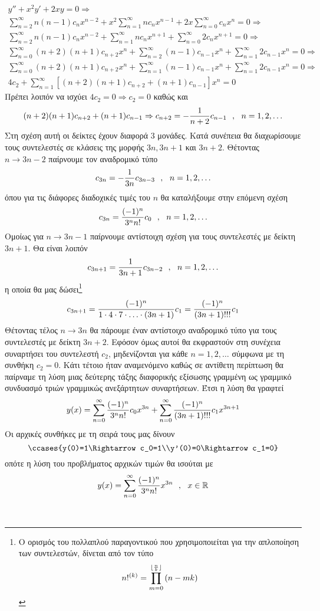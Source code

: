 \documentclass[a4paper,twoside,11pt]{book}
\DeclareRobustCommand{\frac}[3][0pt]{%
{\begingroup\hspace{#1}#2\hspace{#1}\endgroup\over\hspace{#1}#3\hspace{#1}}}
\begin{document}
\begin{rlist}
\begin{gather*}
y''+x^2y'+2xy=0\Rightarrow\\
\sum_{n=2}^{\infty}{n(n-1)c_nx^{n-2}}+x^2\sum_{n=1}^{\infty}{nc_nx^{n-1}}+2x\sum_{n=0}^{\infty}{c_nx^n}=0\Rightarrow\\
\sum_{n=2}^{\infty}{n(n-1)c_nx^{n-2}}+\sum_{n=1}^{\infty}{nc_nx^{n+1}}+\sum_{n=0}^{\infty}{2c_nx^{n+1}}=0\Rightarrow\\
\sum_{n=0}^{\infty}{(n+2)(n+1)c_{n+2}x^{n}}+\sum_{n=2}^{\infty}{(n-1)c_{n-1}x^{n}}+\sum_{n=1}^{\infty}{2c_{n-1}x^{n}}=0\Rightarrow\\
\sum_{n=0}^{\infty}{(n+2)(n+1)c_{n+2}x^{n}}+\sum_{n=1}^{\infty}{(n-1)c_{n-1}x^{n}}+\sum_{n=1}^{\infty}{2c_{n-1}x^{n}}=0\Rightarrow\\
4c_2+\sum_{n=1}^{\infty}{\left[(n+2)(n+1)c_{n+2}+(n+1)c_{n-1}\right]x^n}=0
\end{gather*}
Πρέπει λοιπόν να ισχύει $ 4c_2=0\Rightarrow c_2=0 $ καθώς και 
\[ (n+2)(n+1)c_{n+2}+(n+1)c_{n-1}\Rightarrow c_{n+2}=-\frac{1}{n+2}c_{n-1}\ \ ,\ \ n=1,2,\ldots \]
Στη σχέση αυτή οι δείκτες έχουν διαφορά $ 3 $ μονάδες. Κατά συνέπεια θα διαχωρίσουμε τους συντελεστές σε κλάσεις της μορφής $ 3n,3n+1 $ και $ 3n+2 $. Θέτοντας $ n\to 3n-2 $ παίρνουμε τον αναδρομικό τύπο
\[ c_{3n}=-\frac{1}{3n}c_{3n-3}\ \ ,\ \ n=1,2,\ldots \]
όπου για τις διάφορες διαδοχικές τιμές του $ n $ θα καταλήξουμε στην επόμενη σχέση
\[ c_{3n}=\frac{(-1)^n}{3^nn!}c_0\ \ ,\ \ n=1,2,\ldots \]
Ομοίως για $ n\to 3n-1 $ παίρνουμε αντίστοιχη σχέση για τους συντελεστές με δείκτη $ 3n+1 $. Θα είναι λοιπόν
\[ c_{3n+1}=\frac{1}{3n+1}c_{3n-2}\ \ ,\ \ n=1,2,\ldots \]
η οποία θα μας δώσει\footnote{Ο ορισμός του πολλαπλού παραγοντικού που χρησιμοποιείται για την απλοποίηση των συντελεστών, δίνεται από τον τύπο
\[ n!^{(k)}=\prod_{m=0}^{\lfloor\frac{n}{k} \rfloor}{(n-mk)} \]}
\[ c_{3n+1}=\frac{(-1)^n}{1\cdot4\cdot7\cdot\ldots\cdot(3n+1)}c_1=\frac{(-1)^n}{(3n+1)!!!}c_1 \]
Θέτοντας τέλος $ n\to 3n $ θα πάρουμε έναν αντίστοιχο αναδρομικό τύπο για τους συντελεστές με δείκτη $ 3n+2 $. Εφόσον όμως αυτοί θα εκφραστούν στη συνέχεια συναρτήσει του συντελεστή $ c_2 $, μηδενίζονται για κάθε $ n=1,2,\ldots $ σύμφωνα με τη συνθήκη $ c_2=0 $. Κάτι τέτοιο ήταν αναμενόμενο καθώς σε αντίθετη περίπτωση θα παίρναμε τη λύση μιας δεύτερης τάξης διαφορικής εξίσωσης γραμμένη ως γραμμικό συνδυασμό τριών γραμμικώς ανεξάρτητων συναρτήσεων. Έτσι η λύση θα γραφτεί
\[ y(x)=\sum_{n=0}^{\infty}{\frac{(-1)^n}{3^nn!}c_0x^{3n}}+\sum_{n=0}^{\infty}{\frac{(-1)^n}{(3n+1)!!!}c_1x^{3n+1}} \]
Οι αρχικές συνθήκες με τη σειρά τους μας δίνουν
\[ \ccases{y(0)=1\Rightarrow c_0=1\\y'(0)=0\Rightarrow c_1=0} \]
οπότε η λύση του προβλήματος αρχικών τιμών θα ισούται με
\[ y(x)=\sum_{n=0}^{\infty}{\frac{(-1)^n}{3^nn!}x^{3n}}\ \ ,\ \ x\in\mathbb{R} \]
\end{rlist}\mbox{}\\
\end{document}
